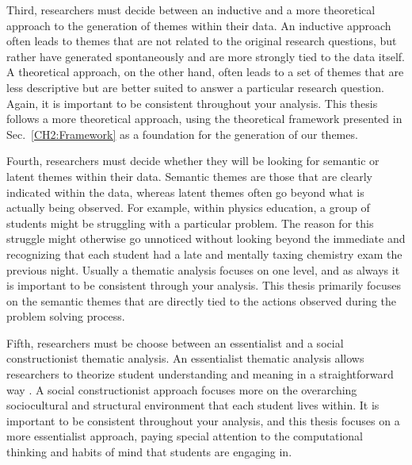 \documentclass{msuphddissertation}
\begin{document}
\begin{doublespace}
Third, researchers must decide between an inductive and a more theoretical approach to the generation of themes within their data.  An inductive approach often leads to themes that are not related to the original research questions, but rather have generated spontaneously and are more strongly tied to the data itself.  A theoretical approach, on the other hand, often leads to a set of themes that are less descriptive but are better suited to answer a particular research question.  Again, it is important to be consistent throughout your analysis.  This thesis follows a more theoretical approach, using the theoretical framework presented in Sec.~\ref{CH2:Framework} as a foundation for the generation of our themes.  %

Fourth, researchers must decide whether they will be looking for semantic or latent themes within their data.  Semantic themes are those that are clearly indicated within the data, whereas latent themes often go beyond what is actually being observed.  For example, within physics education, a group of students might be struggling with a particular problem.  The reason for this struggle might otherwise go unnoticed without looking beyond the immediate and recognizing that each student had a late and mentally taxing chemistry exam the previous night.  Usually a thematic analysis focuses on one level, and as always it is important to be consistent through your analysis.  This thesis primarily focuses on the semantic themes that are directly tied to the actions observed during the problem solving process.

Fifth, researchers must be choose between an essentialist and a social constructionist thematic analysis.  An essentialist thematic analysis allows researchers to theorize student understanding and meaning in a straightforward way \cite{Potter1997,Widdicombe1995}.  A social constructionist approach focuses more on the overarching sociocultural and structural environment that each student lives within.  It is important to be consistent throughout your analysis, and this thesis focuses on a more essentialist approach, paying special attention to the computational thinking and habits of mind that students are engaging in.


\end{doublespace}
\end{document}
